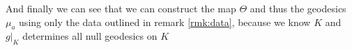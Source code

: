 And finally we can see that we can construct the map $\Theta$ and thus the geodesics $\mu_a$ using only the data outlined in remark \ref{rmk:data}, because we know $K$ and $g\rvert_K$ determines all null geodesics on $K$



